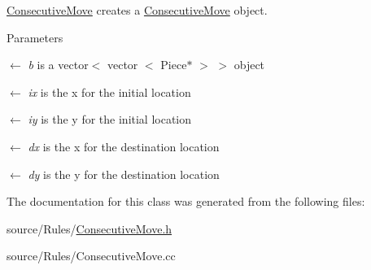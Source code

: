 \hyperlink{classConsecutiveMove}{ConsecutiveMove} creates a \hyperlink{classConsecutiveMove}{ConsecutiveMove} object. 
\begin{DoxyParams}{Parameters}
\item[\mbox{$\leftarrow$} {\em b}]is a vector$<$ vector $<$ Piece$\ast$ $>$ $>$ object \item[\mbox{$\leftarrow$} {\em ix}]is the x for the initial location \item[\mbox{$\leftarrow$} {\em iy}]is the y for the initial location \item[\mbox{$\leftarrow$} {\em dx}]is the x for the destination location \item[\mbox{$\leftarrow$} {\em dy}]is the y for the destination location \end{DoxyParams}


The documentation for this class was generated from the following files:\begin{DoxyCompactItemize}
\item 
source/Rules/\hyperlink{ConsecutiveMove_8h}{ConsecutiveMove.h}\item 
source/Rules/ConsecutiveMove.cc\end{DoxyCompactItemize}

